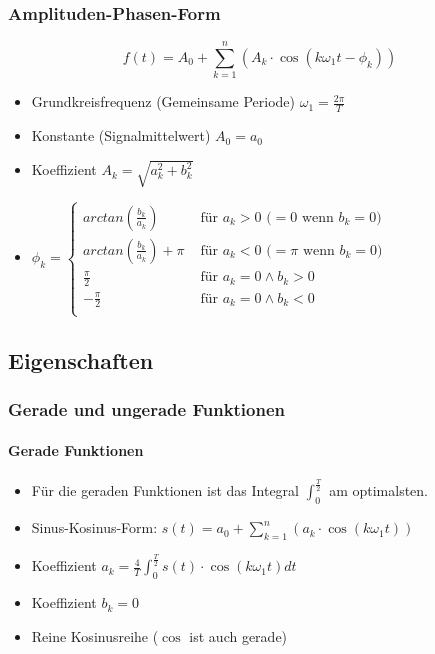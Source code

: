 \subsubsection{Amplituden-Phasen-Form}
\[
  f(t) = A_0 + \sum_{k=1}^{n}
  (A_k \cdot \cos(k \omega_1 t  - \phi_k))
\]
\begin{itemize}
  \item Grundkreisfrequenz (Gemeinsame Periode) $\omega_1 = \frac{2\pi}{T}$
  \item Konstante (Signalmittelwert) $A_0 = a_0$
  \item Koeffizient $A_k = \sqrt{a_k^2 + b_k^2}$
  \item $\phi_k =  \begin{cases}
      arctan\left(\frac{b_k}{a_k}\right) & \text{ für } a_k > 0 
        \text{ (}= 0 \text{ wenn } b_k = 0 \text{)}\\
      arctan\left(\frac{b_k}{a_k}\right) + \pi & \text{ für } a_k < 0
        \text{ (}= \pi \text{ wenn } b_k = 0 \text{)}\\
      \frac{\pi}{2} & \text{ für } a_k = 0 \wedge b_k > 0\\
      -\frac{\pi}{2} & \text{ für } a_k = 0 \wedge b_k < 0\\
    \end{cases}$
\end{itemize}

\subsection{Eigenschaften}
\subsubsection{Gerade und ungerade Funktionen}
\paragraph{Gerade Funktionen}
\begin{itemize}
  \item Für die geraden Funktionen ist das Integral
    $\int_0^{\frac{T}{2}}$ am optimalsten.
  \item Sinus-Kosinus-Form: $s(t) = a_0 + \sum_{k=1}^{n}
    (a_k \cdot \cos(k \omega_1 t))$
  \item Koeffizient $a_k = \frac{4}{T} \int_0^{\frac{T}{2}} s(t) \cdot \cos(k \omega_1 t) dt$
  \item Koeffizient $b_k = 0$
  \item Reine Kosinusreihe ($\cos$ ist auch gerade)
\end{itemize}
